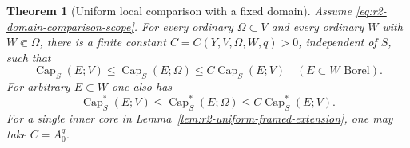 \documentclass[11pt,a4paper]{article}
\numberwithin{equation}{section}
\newtheorem{theorem}{Theorem}[section]
\theoremstyle{definition}
\theoremstyle{remark}
\begin{document}
\begin{theorem}[Uniform local comparison with a fixed domain]
\label{thm:r2-domain-capacity-comparison}
Assume \eqref{eq:r2-domain-comparison-scope}. For every ordinary
$\Omega\subset V$ and every ordinary $W$ with
$\overline W\Subset\Omega$, there is a finite constant
$C=C(Y,V,\Omega,W,q)>0$, independent of $S$, such that
\[
 \operatorname{Cap}_S(E;V)
 \leq\operatorname{Cap}_S(E;\Omega)
 \leq C\operatorname{Cap}_S(E;V)
 \quad(E\subset W\text{ Borel}).
 \tag{C}\label{eq:r2-domain-capacity-comparison}
\]
For arbitrary $E\subset W$ one also has
\[
 \operatorname{Cap}_S^*(E;V)
 \leq\operatorname{Cap}_S^*(E;\Omega)
 \leq C\operatorname{Cap}_S^*(E;V).
 \tag{C*}\label{eq:r2-domain-outer-comparison}
\]
For a single inner core in
Lemma~\ref{lem:r2-uniform-framed-extension}, one may take
$C=A_0^q$.
\end{theorem}
\end{document}
